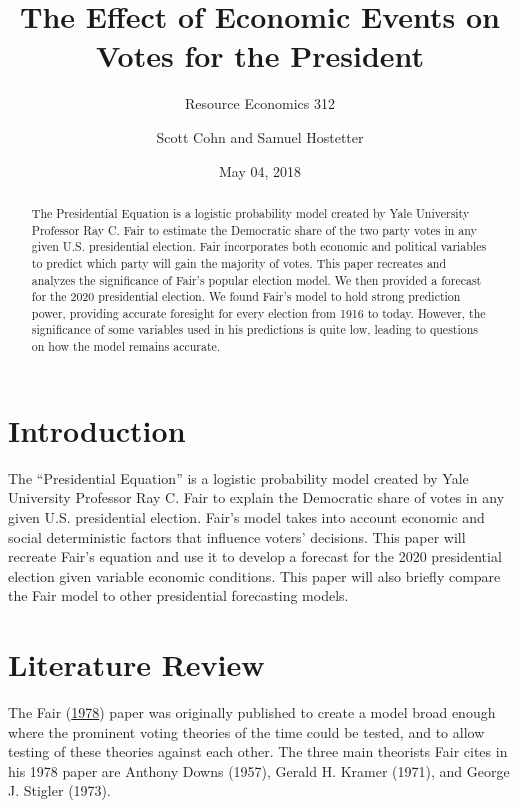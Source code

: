 \documentclass[11,]{article}
\title{The Effect of Economic Events on Votes for the President}
\subtitle{Resource Economics 312}
\author{Scott Cohn and Samuel Hostetter}
\date{May 04, 2018}
\providecommand{\tightlist}{%
  \setlength{\itemsep}{0pt}\setlength{\parskip}{0pt}}
\begin{document}
\maketitle
\begin{abstract}
The Presidential Equation is a logistic probability model created by
Yale University Professor Ray C. Fair to estimate the Democratic share
of the two party votes in any given U.S. presidential election. Fair
incorporates both economic and political variables to predict which
party will gain the majority of votes. This paper recreates and analyzes
the significance of Fair's popular election model. We then provided a
forecast for the 2020 presidential election. We found Fair's model to
hold strong prediction power, providing accurate foresight for every
election from 1916 to today. However, the significance of some variables
used in his predictions is quite low, leading to questions on how the
model remains accurate.
\end{abstract}

\providecommand{\tightlist}{%
  \setlength{\itemsep}{0pt}\setlength{\parskip}{0pt}}

\hypertarget{introduction}{%
\section{Introduction}\label{introduction}}

The ``Presidential Equation'' is a logistic probability model created by
Yale University Professor Ray C. Fair to explain the Democratic share of
votes in any given U.S. presidential election. Fair's model takes into
account economic and social deterministic factors that influence voters'
decisions. This paper will recreate Fair's equation and use it to
develop a forecast for the 2020 presidential election given variable
economic conditions. This paper will also briefly compare the Fair model
to other presidential forecasting models.

\hypertarget{literature-review}{%
\section{Literature Review}\label{literature-review}}

The Fair (\protect\hyperlink{ref-fair_effect_1978}{1978}) paper was
originally published to create a model broad enough where the prominent
voting theories of the time could be tested, and to allow testing of
these theories against each other. The three main theorists Fair cites
in his 1978 paper are Anthony Downs (1957), Gerald H. Kramer (1971), and
George J. Stigler (1973).
\end{document}
